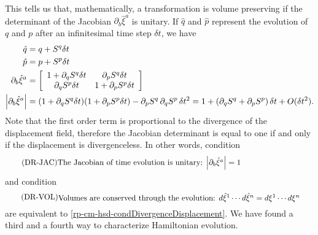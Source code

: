 This tells us that, mathematically, a transformation is volume preserving if the determinant of the Jacobian $\partial_b \hat{\xi}^a$ is unitary. If $\hat{q}$ and $\hat{p}$ represent the evolution of $q$ and $p$ after an infinitesimal time step $\delta t$, we have
\begin{equation}
	\begin{aligned}
	\hat{q} &= q + S^q \delta t \\ 
	\hat{p} &= p + S^p \delta t \\ 
	\partial_b \hat{\xi}^a &= \left[\begin{array}{ c c }
		1 + \partial_q S^q \delta t & \partial_p S^q \delta t \\
		\partial_q S^p \delta t & 1 + \partial_p S^p \delta t \\
	\end{array} \right] \\
	\left|\partial_b \hat{\xi}^a\right| &= (1 + \partial_q S^q \delta t) (1 + \partial_p S^p \delta t) - \partial_p S^q \, \partial_q S^p \, \delta t^2  = 1 + \left(\partial_q S^q + \partial_p S^p \right) \delta t + O(\delta t^2). 
	\end{aligned}
\end{equation}
Note that the first order term is proportional to the divergence of the displacement field, therefore the Jacobian determinant is equal to one if and only if the displacement is divergenceless. In other words, condition
\begin{equation}\label{rp-cm-hsd-condUnitaryJacobian}
	\tag{DR-JAC}
	\eqtext{The Jacobian of time evolution is unitary: $\left|\partial_b \hat{\xi}^a\right|=1$} 
\end{equation}
and condition
\begin{equation}\label{rp-cm-hsd-condConservedVolume}
	\tag{DR-VOL}
	\eqtext{Volumes are conserved through the evolution: $d\hat{\xi}^1 \cdots d\hat{\xi}^n = d\xi^1 \cdots d\xi^n$} 
\end{equation}
are equivalent to \ref{rp-cm-hsd-condDivergenceDisplacement}. We have found a third and a fourth way to characterize Hamiltonian evolution.


